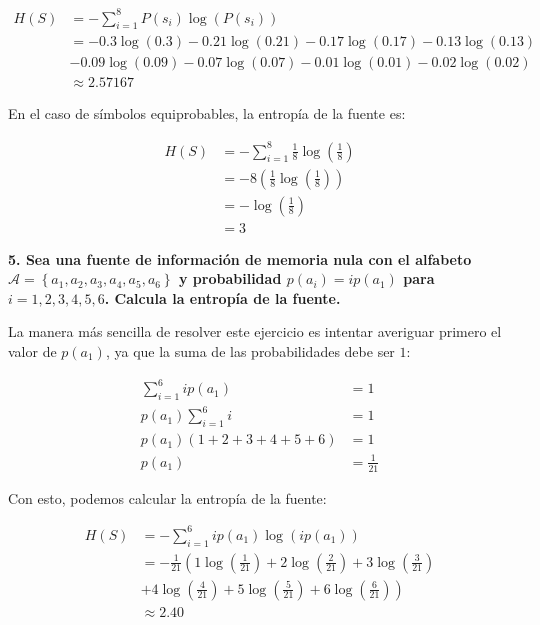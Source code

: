 \documentclass{article}
\begin{document}
\begin{align*}
    H(S) &= -\sum_{i=1}^{8}P(s_i)\log\left(P(s_i)\right)\\
    &= -0.3\log(0.3) - 0.21\log(0.21) - 0.17\log(0.17) - 0.13\log(0.13)\\
    &- 0.09\log(0.09) - 0.07\log(0.07) - 0.01\log(0.01) - 0.02\log(0.02)\\
    &\approx 2.57167
\end{align*}

En el caso de símbolos equiprobables, la entropía de la fuente es:

\begin{align*}
    H(S) &= -\sum_{i=1}^{8}\frac{1}{8}\log\left(\frac{1}{8}\right)\\
    &= -8\left(\frac{1}{8}\log\left(\frac{1}{8}\right)\right)\\
    &= -\log\left(\frac{1}{8}\right)\\
    &= 3
\end{align*}

\vspace{1cm}

\textbf{
5. Sea una fuente de información de memoria nula con el alfabeto $\mathcal{A}=\left\{a_1,a_2,a_3,a_4,a_5,a_6\right\}$ y probabilidad $p\left(a_i\right) = ip\left(a_1\right)$ para $i=1,2,3,4,5,6$. Calcula la entropía de la fuente.
}
\vspace{0.5cm}

La manera más sencilla de resolver este ejercicio es intentar averiguar primero el valor de $p\left(a_1\right)$, ya que la suma de las probabilidades debe ser $1$:

\begin{align*}
    \sum_{i=1}^{6}ip\left(a_1\right) &= 1\\
    p\left(a_1\right)\sum_{i=1}^{6}i &= 1\\
    p\left(a_1\right)\left(1+2+3+4+5+6\right) &= 1\\
    p\left(a_1\right) &= \frac{1}{21}
\end{align*}

Con esto, podemos calcular la entropía de la fuente:

\begin{align*}
    H(S) &= -\sum_{i=1}^{6}ip\left(a_1\right)\log\left(ip\left(a_1\right)\right)\\
    &= -\frac{1}{21}\left(1\log\left(\frac{1}{21}\right) + 2\log\left(\frac{2}{21}\right) + 3\log\left(\frac{3}{21}\right)\right.\\
    &+ \left.4\log\left(\frac{4}{21}\right) + 5\log\left(\frac{5}{21}\right) + 6\log\left(\frac{6}{21}\right)\right)\\
    &\approx 2.40
\end{align*}
\end{document}

